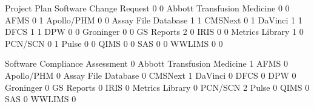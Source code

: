 \documentclass{article}
\begin{document}
\begin{Schunk}
\begin{Soutput}
                              Project Plan Software Change Request
                                         0                       0
  Abbott Transfusion Medicine            0                       0
  AFMS                                   0                       1
  Apollo/PHM                             0                       0
  Assay File Database                    1                       1
  CMSNext                                0                       1
  DaVinci                                1                       1
  DFCS                                   1                       1
  DPW                                    0                       0
  Groninger                              0                       0
  GS Reports                             2                       0
  IRIS                                   0                       0
  Metrics Library                        1                       0
  PCN/SCN                                0                       1
  Pulse                                  0                       0
  QIMS                                   0                       0
  SAS                                    0                       0
  WWLIMS                                 0                       0
                             
                              Software Compliance Assessment
                                                           0
  Abbott Transfusion Medicine                              1
  AFMS                                                     0
  Apollo/PHM                                               0
  Assay File Database                                      0
  CMSNext                                                  1
  DaVinci                                                  0
  DFCS                                                     0
  DPW                                                      0
  Groninger                                                0
  GS Reports                                               0
  IRIS                                                     0
  Metrics Library                                          0
  PCN/SCN                                                  2
  Pulse                                                    0
  QIMS                                                     0
  SAS                                                      0
  WWLIMS                                                   0
                             

\end{Soutput}
\end{Schunk}
\end{document}
